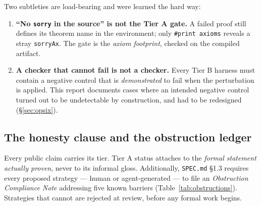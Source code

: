 \documentclass[11pt,a4paper]{article}
\theoremstyle{definition}
\theoremstyle{plain}
\begin{document}
Two subtleties are load-bearing and were learned the hard way:

\begin{enumerate}[leftmargin=*]
\item \textbf{``No \texttt{sorry} in the source'' is not the Tier A gate.} A failed proof still
defines its theorem name in the environment; only \texttt{\#print axioms} reveals a stray
\texttt{sorryAx}. The gate is the \emph{axiom footprint}, checked on the compiled artifact.
\item \textbf{A checker that cannot fail is not a checker.} Every Tier B harness must contain
a negative control that is \emph{demonstrated} to fail when the perturbation is applied. This
report documents cases where an intended negative control turned out to be undetectable by
construction, and had to be redesigned (\S\ref{sec:opsix}).
\end{enumerate}

\subsection{The honesty clause and the obstruction ledger}

Every public claim carries its tier. Tier A status attaches to the \emph{formal statement
actually proven}, never to its informal gloss. Additionally, \texttt{SPEC.md} \S1.3 requires
every proposed strategy --- human or agent-generated --- to file an \emph{Obstruction
Compliance Note} addressing five known barriers (Table~\ref{tab:obstructions}). Strategies
that cannot are rejected at review, before any formal work begins.
\end{document}
